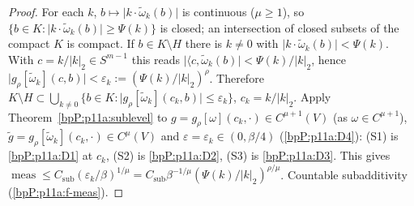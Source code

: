 \begin{proof}
\label{stepP:p11a:dm-compact} For each $k$, $b\mapsto\lvert k\cdot\tilde\omega_k(b)\rvert$ is continuous ($\mu\ge1$), so $\{b\in K:\lvert k\cdot\tilde\omega_k(b)\rvert\ge\Psi(k)\}$ is closed; an intersection of closed subsets of the compact $K$ is compact.
\label{stepP:p11a:dm-union} If $b\in K\setminus H$ there is $k\ne0$ with $\lvert k\cdot\tilde\omega_k(b)\rvert<\Psi(k)$. With $c=k/\lvert k\rvert_2\in S^{m-1}$ this reads $\lvert\langle c,\tilde\omega_k(b)\rvert<\Psi(k)/\lvert k\rvert_2$, hence $\lvert g_\rho[\tilde\omega_k](c,b)\rvert<\varepsilon_k:=(\Psi(k)/\lvert k\rvert_2)^\rho$. Therefore $K\setminus H\subset\bigcup_{k\ne0}\{b\in K:\lvert g_\rho[\tilde\omega_k](c_k,b)\rvert\le\varepsilon_k\}$, $c_k=k/\lvert k\rvert_2$.
\label{stepP:p11a:dm-onek} Apply Theorem~\ref{bpP:p11a:sublevel} to $g=g_\rho[\omega](c_k,\cdot)\in C^{\mu+1}(V)$ (as $\omega\in C^{\mu+1}$), $\tilde g=g_\rho[\tilde\omega_k](c_k,\cdot)\in C^\mu(V)$ and $\varepsilon=\varepsilon_k\in(0,\beta/4)$ (\ref{bpP:p11a:D4}): (S1) is \ref{bpP:p11a:D1} at $c_k$, (S2) is \ref{bpP:p11a:D2}, (S3) is \ref{bpP:p11a:D3}. This gives $\operatorname{meas}\le C_{\mathrm{sub}}(\varepsilon_k/\beta)^{1/\mu}=C_{\mathrm{sub}}\beta^{-1/\mu}(\Psi(k)/\lvert k\rvert_2)^{\rho/\mu}$.
\label{stepP:p11a:dm-sum} Countable subadditivity (\ref{bpP:p11a:f-meas}).
\end{proof}

